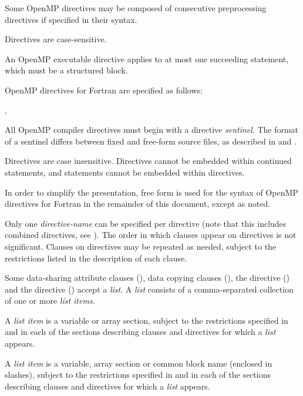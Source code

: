 Some OpenMP directives may be composed of consecutive  preprocessing 
directives if specified in their syntax.

Directives are case-sensitive. 

An OpenMP executable directive applies to at most one succeeding statement, which 
must be a structured block.
\ccppspecificend

\fortranspecificstart
OpenMP directives for Fortran are specified as follows:

\begin{boxedcode}
\plc{sentinel directive-name [clause[ [},\plc{] clause]...]}
\end{boxedcode}

All OpenMP compiler directives must begin with a directive \emph{sentinel}. The format of a 
sentinel differs between fixed and free-form source files, as described in 
 and .

Directives are case insensitive. Directives cannot be embedded within continued 
statements, and statements cannot be embedded within directives.

In order to simplify the presentation, free form is used for the syntax of OpenMP 
directives for Fortran in the remainder of this document, except as noted.
\fortranspecificend

Only one \emph{directive-name} can be specified per directive (note that this includes combined 
directives, see ).  The order in which clauses appear on directives 
is not significant. Clauses on directives may be repeated as needed, subject to the 
restrictions listed in the description of each clause.

Some data-sharing attribute clauses (), 
data copying clauses (), the  directive 
() and the  directive () 
accept a \emph{list}. A \emph{list} consists of a comma-separated collection of 
one or more \emph{list items}. 

\ccppspecificstart
A \emph{list item} is a variable or array section, subject to the restrictions specified in 
and in each of the sections describing clauses and directives for 
which a \emph{list} appears.
\ccppspecificend

\fortranspecificstart
A \emph{list item} is a variable, array section or common block name (enclosed in slashes), 
subject to the restrictions specified in 
and in each of the sections 
describing clauses and directives for which a \emph{list} appears.
\fortranspecificend







